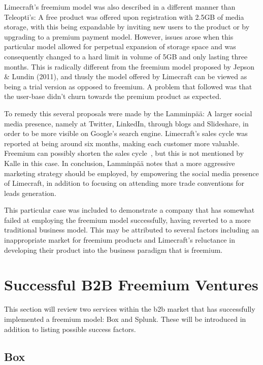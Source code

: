 Limecraft's freemium model was also described in a different manner than Teleopti's: A free product was offered upon registration with 2.5GB of media storage, with this being expandable by inviting new users to the product or by upgrading to a premium payment model. However, issues arose when this particular model allowed for perpetual expansion of storage space and was consequently changed to a hard limit in volume of 5GB and only lasting three months. This is radically different from the freemium model proposed by Jepson \& Lundin (2011), and thusly the model offered by Limecraft can be viewed as being a trial version as opposed to freemium. A problem that followed was that the user-base didn't churn towards the premium product as expected. 


To remedy this several proposals were made by the Lamminpää: A larger social media presence, namely at Twitter, LinkedIn, through blogs and Slideshare, in order to be more visible on Google's search engine. Limecraft's sales cycle was reported at being around six months, making each customer more valuable. Freemium can possibly shorten the sales cycle~\cite{davidskokN/A}, but this is not mentioned by Kalle in this case. In conclusion, Lamminpää notes that a more aggressive marketing strategy should be employed, by empowering the social media presence of Limecraft, in addition to focusing on attending more trade conventions for leads generation. 


This particular case was included to demonstrate a company that has somewhat failed at employing the freemium model successfully, having reverted to a more traditional business model. This may be attributed to several factors including an inappropriate market for freemium products and Limecraft's reluctance in developing their product into the business paradigm that is freemium. 

\section{Successful B2B Freemium Ventures}
This section will review two services within the \gls{b2b} market that has successfully implemented a freemium model: Box and Splunk. These will be introduced in addition to listing possible success factors.
\subsection{Box}
